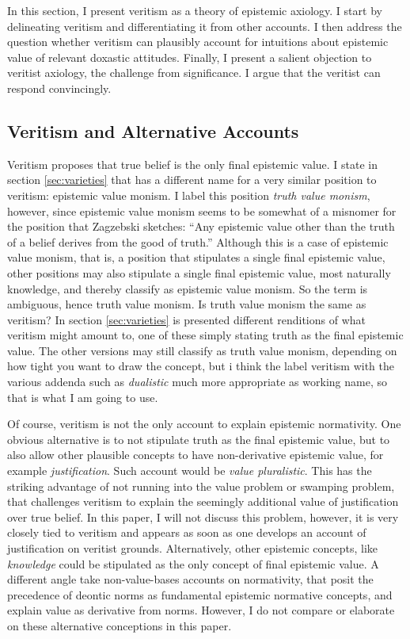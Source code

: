 \documentclass[12pt,numbers=noenddot]{scrartcl}
\begin{document}
In this section, I present veritism as a theory of epistemic axiology. I start by delineating veritism and differentiating it from other accounts. I then address the question whether veritism can plausibly account for intuitions about epistemic value of relevant doxastic attitudes. Finally, I present a salient objection to veritist axiology, the challenge from significance. I argue that the veritist can respond convincingly.

\subsection{Veritism and Alternative Accounts}

Veritism proposes that true belief is the only final epistemic value. I state in section \ref{sec:varieties} that \textcite[191]{Zagzebski2004-ZAGEVM-2} has a different name for a very similar position to veritism: epistemic value monism. I label this position \emph{truth value monism}, however, since epistemic value monism seems to be somewhat of a misnomer for the position that Zagzebski sketches: “Any epistemic value other than the truth of a belief derives from the good of truth.” Although this is a case of epistemic value monism, that is, a position that stipulates a single final epistemic value, other positions may also stipulate a single final epistemic value, most naturally knowledge, and thereby classify as epistemic value monism. So the term is ambiguous, hence truth value monism.
Is truth value monism the same as veritism? In section \ref{sec:varieties} is presented different renditions of what veritism might amount to, one of these simply stating truth as the final epistemic value. The other versions may still classify as truth value monism, depending on how tight you want to draw the concept, but i think the label veritism with the various addenda such as \emph{dualistic} much more appropriate as working name, so that is what I am going to use.

Of course, veritism is not the only account to explain epistemic normativity. One obvious alternative is to not stipulate truth as the final epistemic value, but to also allow other plausible concepts to have non-derivative epistemic value, for example \emph{justification}. Such account would be \emph{value pluralistic}. This has the striking advantage of not running into the value problem or swamping problem, that challenges veritism to explain the seemingly additional value of justification over true belief. In this paper, I will not discuss this problem, however, it is very closely tied to veritism and appears as soon as one develops an account of justification on veritist grounds. Alternatively, other epistemic concepts, like \emph{knowledge} could be stipulated as the only concept of final epistemic value. A different angle take non-value-bases accounts on normativity, that posit the precedence of deontic norms as fundamental epistemic normative concepts, and explain value as derivative from norms. However, I do not compare or elaborate on these alternative conceptions in this paper.
\end{document}
